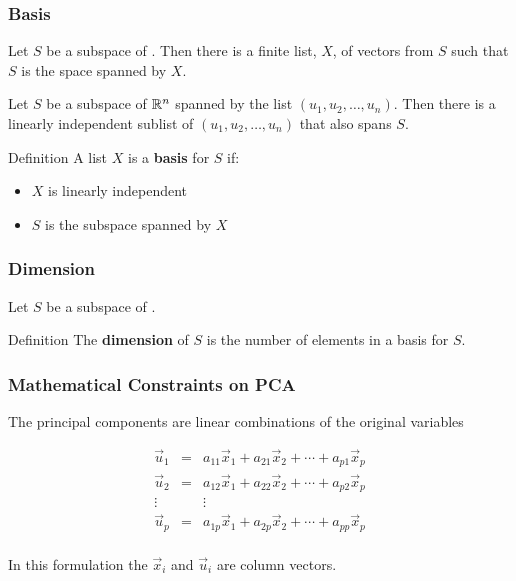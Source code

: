 \documentclass{beamer}
\begin{document}
\begin{frame}
  \frametitle{Basis}

Let $S$ be a subspace of \RealN.  Then there is a finite list, $X$, of vectors from $S$ such that $S$ is the space spanned by $X$.
\medskip

Let $S$ be a subspace of $\mathbb{R}^n$ spanned by the list $(u_1, u_2, \ldots, u_n)$. Then  there is a linearly independent sublist of $(u_1, u_2, \ldots, u_n)$ that also spans $S$.
\medskip

\begin{block}{Definition}
A list $X$ is a \textbf{basis} for $S$ if:
\begin{itemize}
\item $X$ is linearly independent
\item $S$ is the subspace spanned by $X$
\end{itemize}
\end{block}

\end{frame}

\begin{frame}
  \frametitle{Dimension}
Let $S$ be a subspace of \RealN.
\bigskip

\begin{block}{Definition}
The \textbf{dimension} of $S$ is the number of elements in a basis for $S$.
\end{block}

\end{frame}






\begin{frame}
  \frametitle{Mathematical Constraints on PCA}

The principal components are linear combinations of the original variables
\smallskip

\[ \begin{array}{ccc}
\vec{u}_1 & = & a_{11}\vec{x}_1 + a_{21}\vec{x}_2 + \cdots + a_{p1}\vec{x}_p \\
\vec{u}_2 & = & a_{12}\vec{x}_1 + a_{22}\vec{x}_2 + \cdots + a_{p2}\vec{x}_p \\
\vdots & & \vdots \\
\vec{u}_p & = & a_{1p}\vec{x}_1 + a_{2p}\vec{x}_2 + \cdots + a_{pp}\vec{x}_p \\
\end{array}
\]

\bigskip

In this formulation the $\vec{x}_i$ and $\vec{u}_i$ are column vectors.
\end{frame}
\end{document}

